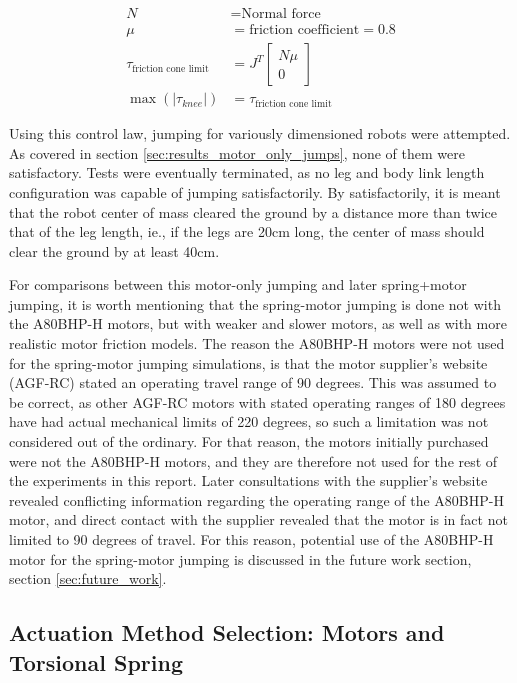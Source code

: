 \begin{align}
    N &= \text{Normal force} \\
    \mu &= \text{friction coefficient} = 0.8 \\
    \tau_{\text{friction cone limit}} &= J^T 
    \begin{bmatrix}
        N \mu \\
        0
    \end{bmatrix} \\
    \max(|\tau_{knee}|) &= \tau_{\text{friction cone limit}}
    \label{eq:friction_cone_limit}
\end{align}

Using this control law, jumping for variously dimensioned robots were attempted. As covered in section \ref{sec:results_motor_only_jumps}, none of them were satisfactory. Tests were eventually terminated, as no leg and body link length configuration was capable of jumping satisfactorily. By satisfactorily, it is meant that the robot center of mass cleared the ground by a distance more than twice that of the leg length, ie., if the legs are 20cm long, the center of mass should clear the ground by at least 40cm. 

For comparisons between this motor-only jumping and later spring+motor jumping, it is worth mentioning that the spring-motor jumping is done not with the A80BHP-H motors, but with weaker and slower motors, as well as with more realistic motor friction models. The reason the A80BHP-H motors were not used for the spring-motor jumping simulations, is that the motor supplier's website (AGF-RC) stated an operating travel range of 90 degrees. This was assumed to be correct, as other AGF-RC motors with stated operating ranges of 180 degrees have had actual mechanical limits of 220 degrees, so such a limitation was not considered out of the ordinary. For that reason, the motors initially purchased were not the A80BHP-H motors, and they are therefore not used for the rest of the experiments in this report. Later consultations with the supplier's website revealed conflicting information regarding the operating range of the A80BHP-H motor, and direct contact with the supplier revealed that the motor is in fact not limited to 90 degrees of travel. For this reason, potential use of the A80BHP-H motor for the spring-motor jumping is discussed in the future work section, section \ref{sec:future_work}. 


\subsection{Actuation Method Selection: Motors and Torsional Spring}


